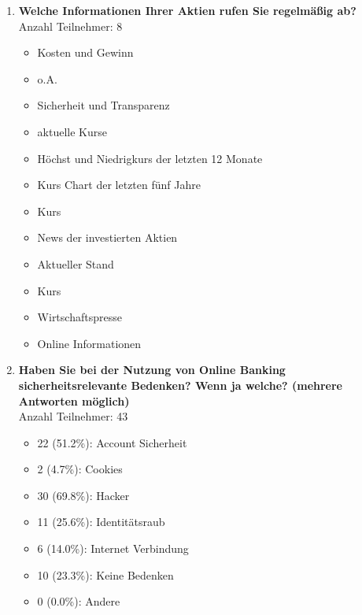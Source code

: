 \begin{enumerate}
    \item \textbf{Welche Informationen Ihrer Aktien rufen Sie regelmäßig ab?}\\ Anzahl Teilnehmer: 8
     \begin{itemize}
        \item Kosten und Gewinn
        \item o.A.
        \item Sicherheit und Transparenz
        \item aktuelle Kurse
        \item Höchst und Niedrigkurs der letzten 12 Monate
        \item Kurs Chart der letzten fünf Jahre
        \item Kurs
        \item News der investierten Aktien
        \item Aktueller Stand
        \item Kurs
        \item Wirtschaftspresse
        \item Online Informationen
    \end{itemize}
    
     \item \textbf{Haben Sie bei der Nutzung von Online Banking sicherheitsrelevante Bedenken? Wenn ja welche? (mehrere Antworten möglich)} \\ Anzahl Teilnehmer: 43
    \begin{itemize}
        \item[] 22 (51.2\%): Account Sicherheit
        \item[] 2 (4.7\%): Cookies
        \item[] 30 (69.8\%): Hacker
        \item[] 11 (25.6\%): Identitätsraub
        \item[] 6 (14.0\%): Internet Verbindung
        \item[] 10 (23.3\%): Keine Bedenken
        \item[] 0 (0.0\%): Andere 
    \end{itemize}
    

\end{enumerate}
